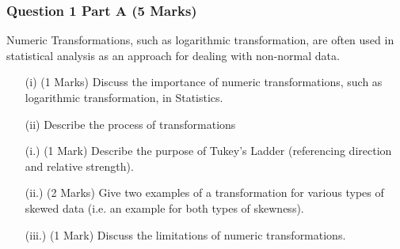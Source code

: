 \documentclass[a4paper,12pt]{article}
\begin{document}
	\subsubsection*{Question 1 Part A (5 Marks)}
	Numeric Transformations, such as logarithmic transformation, are often used in statistical analysis as an approach for dealing with non-normal data.
	\begin{itemize}
		\item[(i)] (1 Marks) Discuss the importance of numeric transformations, such as logarithmic transformation, in Statistics.
		\item[(ii)] Describe the process of transformations
		\item[(i.)] (1 Mark) Describe the purpose of Tukey's Ladder (referencing direction and relative strength).
		\item[(ii.)] (2 Marks) Give two examples of a transformation for various types of skewed data (i.e. an example for both types of skewness).
		\item[(iii.)] (1 Mark) Discuss the limitations of numeric transformations.
	\end{itemize}
	
\end{document}
